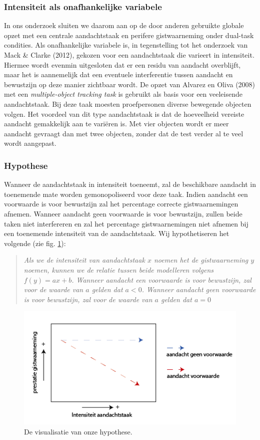 \documentclass[a4paper,jou]{apa6}  %
\begin{document}
\subsubsection{Intensiteit als onafhankelijke variabele}
In ons onderzoek sluiten we daarom aan op de door anderen gebruikte globale opzet met een centrale aandachtstaak en perifere gistwaarneming onder dual-task condities. Als onafhankelijke variabele is, in tegenstelling tot het onderzoek van Mack \& Clarke (2012), gekozen voor een aandachtstaak die varieert in intensiteit. Hiermee wordt evenmin uitgesloten dat er een residu van aandacht overblijft, maar het is aannemelijk dat een eventuele interferentie tussen aandacht en bewustzijn op deze manier zichtbaar wordt.
De opzet van Alvarez en Oliva (2008) met een \textit{multiple-object tracking task} is gebruikt als basis voor een veeleisende aandachtstaak. Bij deze taak moesten proefpersonen diverse bewegende objecten volgen. Het voordeel van dit type aandachtstaak is dat de hoeveelheid vereiste aandacht gemakkelijk aan te vari\"eren is. Met vier objecten wordt er meer aandacht gevraagt dan met twee objecten, zonder dat de test verder al te veel wordt aangepast. 
\subsubsection{Hypothese}
Wanneer de aandachtstaak in intensiteit toeneemt, zal de beschikbare aandacht in toenemende mate worden gemonopoliseerd voor deze taak. Indien aandacht een voorwaarde is voor bewustzijn zal het percentage correcte gistwaarnemingen afnemen. Wanneer aandacht geen voorwaarde is voor bewustzijn, zullen beide taken niet interfereren en zal het percentage gistwaarnemingen niet afnemen bij een toenemende intensiteit van de aandachtstaak. Wij hypothetiseren het volgende (zie fig. \ref{fig:hypothese}):
\begin{quote}
\textit{Als we de intensiteit van aandachtstaak $x$ noemen het de gistwaarneming $y$ noemen, kunnen we de relatie tussen beide modelleren volgens $f(y)=ax+b$. Wanneer aandacht een voorwaarde is voor bewustzijn, zal voor de waarde van $a$ gelden dat $a<0$. Wanneer aandacht geen voorwaarde is voor bewustzijn, zal voor de waarde van $a$ gelden dat $a=0$}
\end{quote}
\begin{figure}
\centering
\includegraphics[width=1.0\linewidth]{illustratieHypothese.png}
\caption{\label{fig:hypothese}De visualisatie van onze hypothese.}
\end{figure}
\end{document}
